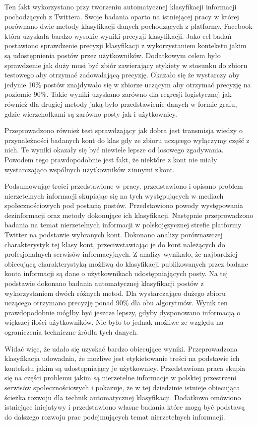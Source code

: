 \par
Ten fakt wykorzystano przy tworzeniu automatycznej klasyfikacji informacji pochodzących z Twittera. Swoje badania oparto na istniejącej pracy w której porównano dwie metody klasyfikacji danych pochodzących z platformy, Facebook która uzyskała bardzo wysokie wyniki precyzji klasyfikacji. Jako cel badań postawiono sprawdzenie precyzji klasyfikacji z wykorzystaniem kontekstu jakim są udostępnienia postów przez użytkowników. Dodatkowym celem było sprawdzenie jak duży musi być zbiór zawierający etykiety w stosunku do zbioru testowego aby otrzymać zadowalającą precyzję. Okazało się że wystarczy aby jedynie 10\% postów znajdywało się w zbiorze uczącym aby otrzymać precyzję na poziomie 90\%.  Takie wyniki uzyskano zarówno dla regresji logistycznej jak również dla drugiej metody jaką było przedstawienie danych w formie grafu, gdzie wierzchołkami są zarówno posty jak i użytkownicy.
\par 
Przeprowadzono również test sprawdzający jak dobra jest transmisja wiedzy o przynależności badanych kont do klas gdy ze zbioru uczącego wyłączymy część z nich. Te wyniki okazały się być niewiele lepsze od losowego zgadywania. Powodem tego prawdopodobnie jest fakt, że niektóre z kont nie miały wystarczająco wspólnych użytkowników z\,innymi z\,kont.
\par
Podsumowując treści przedstawione w pracy, przedstawiono i opisano problem nierzetelnych informacji skupiając się na tych występujących w mediach społecznościowych pod postacią postów. Przedstawiono powody występowania dezinformacji oraz metody dokonujące ich klasyfikacji. Następnie przeprowadzono badania na temat nierzetelnych informacji w polskojęzycznej strefie platformy Twitter na podstawie wybranych kont. Dokonano analizy porównawczej charakterystyk tej klasy kont, przeciwstawiając je do kont należących do profesjonalnych serwisów informacyjnych. Z analizy wynikało, że najbardziej obiecującą charakterystyką możliwą do klasyfikacji publikowanych przez badane konta informacji są dane o użytkownikach udostępniających posty. Na tej podstawie dokonano badania automatycznej klasyfikacji postów z wykorzystaniem dwóch różnych metod. Dla wystarczająco dużego zbioru uczącego otrzymano precyzję ponad 90\% dla obu algorytmów. Wynik ten prawdopodobnie mógłby być jeszcze lepszy, gdyby dysponowano informacją o większej ilości użytkowników. Nie było to jednak możliwe ze względu na ograniczenia techniczne źródła tych danych. 
\par
Widać więc, że udało się uzyskać bardzo obiecujące wyniki. Przeprowadzona klasyfikacja udowadnia, że możliwe jest etykietowanie treści na podstawie ich kontekstu jakim są udostępniający je użytkownicy. Przedstawiona praca skupia się na części problemu jakim są nierzetelne informacje w polskiej przestrzeni serwisów społecznościowych i pokazuje, że w tej dziedzinie istnieje obiecująca ścieżka rozwoju dla technik automatycznej klasyfikacji. Dodatkowo omówiono istniejące inicjatywy i przedstawiono własne badania które mogą być podstawą do dalszego rozwoju prac podejmujących temat nierzetelnych informacji. 
